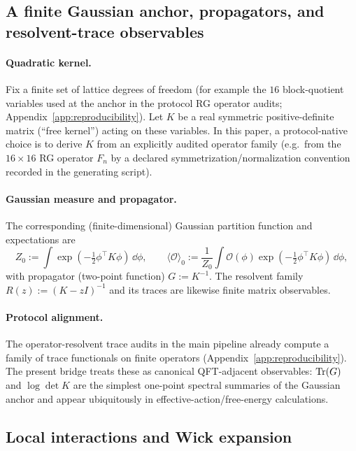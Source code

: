 \subsection{A finite Gaussian anchor, propagators, and resolvent-trace observables}

\paragraph{Quadratic kernel.}
\AuditTag Fix a finite set of lattice degrees of freedom (for example the $16$ block-quotient variables used at the anchor in the protocol RG operator audits; Appendix~\ref{app:reproducibility}).
Let $K$ be a real symmetric positive-definite matrix (``free kernel'') acting on these variables.
In this paper, a protocol-native choice is to derive $K$ from an explicitly audited operator family (e.g.\ from the $16\times 16$ RG operator $F_n$ by a declared symmetrization/normalization convention recorded in the generating script).

\paragraph{Gaussian measure and propagator.}
\MathTag The corresponding (finite-dimensional) Gaussian partition function and expectations are
\[
Z_0:=\int \exp\!\left(-\tfrac12 \phi^\top K\phi\right)\,\dd\phi,
\qquad
\langle \mathcal{O}\rangle_0:=\frac{1}{Z_0}\int \mathcal{O}(\phi)\exp\!\left(-\tfrac12 \phi^\top K\phi\right)\,\dd\phi,
\]
with propagator (two-point function) $G:=K^{-1}$.
The resolvent family $R(z):=(K-zI)^{-1}$ and its traces are likewise finite matrix observables.

\paragraph{Protocol alignment.}
\AuditTag The operator-resolvent trace audits in the main pipeline already compute a family of trace functionals on finite operators (Appendix~\ref{app:reproducibility}).
The present bridge treats these as canonical QFT-adjacent observables: $\mathrm{Tr}(G)$ and $\log\det K$ are the simplest one-point spectral summaries of the Gaussian anchor and appear ubiquitously in effective-action/free-energy calculations.

\subsection{Local interactions and Wick expansion}

